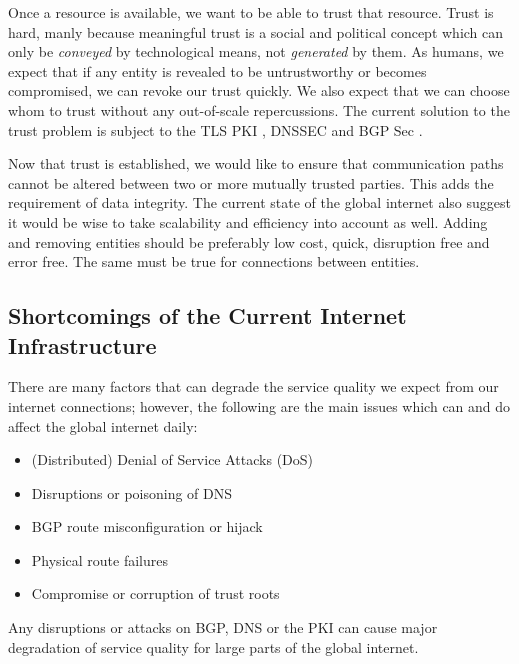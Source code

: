 \documentclass[../eva1_scion.tex]{subfiles}
\begin{document}
Once a resource is available, we want to be able to trust that resource. Trust is hard, manly because meaningful trust is a social and political concept which can only be \textit{conveyed} by technological means, not \textit{generated} by them. As humans, we expect that if any entity is revealed to be untrustworthy or becomes compromised, we can revoke our trust quickly. We also expect that we can choose whom to trust without any out-of-scale repercussions. The current solution to the trust problem is subject to the TLS PKI \cite{rfc_pki}, DNSSEC \cite{rfc_dnssec} and BGP Sec \cite{rfc_bgpsec}.

Now that trust is established, we would like to ensure that communication paths cannot be altered between two or more mutually trusted parties. This adds the requirement of data integrity. The current state of the global internet also suggest it would be wise to take scalability and efficiency into account as well. Adding and removing entities should be preferably low cost, quick, disruption free and error free. The same must be true for connections between entities.

\subsection{Shortcomings of the Current Internet Infrastructure}%
\label{ssec:shortcomings}

There are many factors that can degrade the service quality we expect from our internet connections; however, the following are the main issues which can and do affect the global internet daily:

    \begin{itemize}
        \item (Distributed) Denial of Service Attacks (DoS)
        \item Disruptions or poisoning of DNS
        \item BGP route misconfiguration or hijack
        \item Physical route failures
        \item Compromise or corruption of trust roots
    \end{itemize}

    Any disruptions or attacks on BGP, DNS or the PKI can cause major degradation of service quality for large parts of the global internet.
\end{document}
